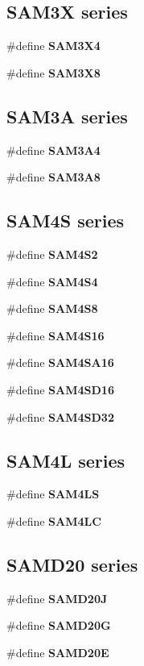 \subsection*{S\-A\-M3\-X series}
\begin{DoxyCompactItemize}
\item 
\#define {\bfseries S\-A\-M3\-X4}
\item 
\#define {\bfseries S\-A\-M3\-X8}
\end{DoxyCompactItemize}
\subsection*{S\-A\-M3\-A series}
\begin{DoxyCompactItemize}
\item 
\#define {\bfseries S\-A\-M3\-A4}
\item 
\#define {\bfseries S\-A\-M3\-A8}
\end{DoxyCompactItemize}
\subsection*{S\-A\-M4\-S series}
\begin{DoxyCompactItemize}
\item 
\#define {\bfseries S\-A\-M4\-S2}
\item 
\#define {\bfseries S\-A\-M4\-S4}
\item 
\#define {\bfseries S\-A\-M4\-S8}
\item 
\#define {\bfseries S\-A\-M4\-S16}
\item 
\#define {\bfseries S\-A\-M4\-S\-A16}
\item 
\#define {\bfseries S\-A\-M4\-S\-D16}
\item 
\#define {\bfseries S\-A\-M4\-S\-D32}
\end{DoxyCompactItemize}
\subsection*{S\-A\-M4\-L series}
\begin{DoxyCompactItemize}
\item 
\#define {\bfseries S\-A\-M4\-L\-S}
\item 
\#define {\bfseries S\-A\-M4\-L\-C}
\end{DoxyCompactItemize}
\subsection*{S\-A\-M\-D20 series}
\begin{DoxyCompactItemize}
\item 
\#define {\bfseries S\-A\-M\-D20\-J}
\item 
\#define {\bfseries S\-A\-M\-D20\-G}
\item 
\#define {\bfseries S\-A\-M\-D20\-E}
\end{DoxyCompactItemize}
